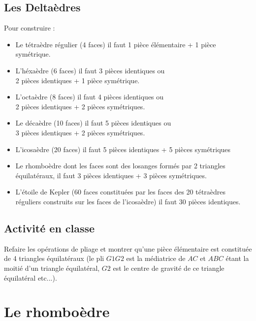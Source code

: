 \documentclass[a4paper,11pt]{book}
\begin{document}
\subsection{Les Delta\`edres} 
Pour construire :
\begin{itemize}
\item Le t\'etra\`edre r\'egulier (4 faces) il faut 
1 pi\`ece \'el\'ementaire + 1 pi\`ece sym\'etrique. 
\item L'h\'exa\`edre (6 faces) il faut 
3 pi\`eces identiques ou \\
2 pi\`eces identiques + 1 pi\`ece sym\'etrique. 
\item L'octa\`edre (8 faces) il faut
4 pi\`eces identiques ou \\
2 pi\`eces identiques + 2 pi\`eces sym\'etriques. 
\item Le d\'eca\`edre (10 faces) il faut 
5 pi\`eces identiques ou \\
3 pi\`eces identiques + 2 pi\`eces sym\'etriques. 
\item L'icosa\`edre (20 faces) il faut
5 pi\`eces identiques + 5 pi\`eces sym\'etriques 
\item Le rhombo\`edre dont les faces sont des losanges form\'es par 2 triangles
\'equilat\'eraux, il faut
3 pi\`eces identiques + 3 pi\`eces sym\'etriques. 
\item L'\'etoile de Kepler (60 faces constitu\'ees par les faces des 20
t\'etra\`edres r\'eguliers construits sur les faces de l'icosa\`edre) 
il faut 30 pi\`eces identiques.
\end{itemize}
\subsection{Activit\'e en classe}
Refaire les op\'erations de pliage et montrer qu'une pi\`ece 
\'el\'ementaire est constitu\'ee de 4 triangles \'equilat\'eraux (le pli 
$G1G2$ est la m\'ediatrice de $AC$ et $ABC$ \'etant la moiti\'e d'un triangle 
\'equilat\'eral, $G2$ est le centre de gravit\'e de ce triangle 
\'equilat\'eral etc...).
\section{Le rhombo\`edre}
\end{document}
